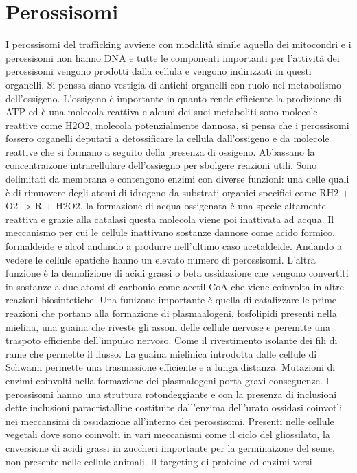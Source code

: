 \section{Perossisomi}
I perossisomi del trafficking avviene con modalit\`a simile aquella dei mitocondri e i perossisomi non hanno DNA e tutte le componenti importanti per l'attivit\`a dei perossisomi
vengono prodotti dalla cellula e vengono indirizzati in questi organelli. Si penssa siano vestigia di antichi organelli con ruolo nel metabolismo dell'ossigeno. L'ossigeno \`e importante
in quanto rende efficiente la prodizione di ATP ed \`e una molecola reattiva e alcuni dei suoi metaboliti sono molecole reattive come H2O2, molecola potenzialmente dannosa, si pensa 
che i perossisomi fossero organelli deputati a detossificare la cellula dall'ossigeno e da molecole reattive che si formano a seguito della presenza di ossigeno. Abbassano 
la concentraizone intracellulare dell'ossiegno per sbolgere reazioni utili. Sono delimitati da membrana e contengono enzimi con diverse funzioni: una delle quali \`e di rimuovere degli
atomi di idrogeno da substrati organici specifici come RH2 + O2 -> R + H2O2, la formazione di acqua ossigenata \`e una specie altamente reattiva e grazie alla catalasi questa molecola
viene poi inattivata ad acqua. Il meccanismo per cui le cellule inattivano sostanze dannose come acido formico, formaldeide e alcol andando a produrre nell'ultimo caso acetaldeide. 
Andando a vedere le cellule epatiche hanno un elevato numero di perossisomi. L'altra funzione \`e la demolizione di acidi grassi o beta ossidazione che vengono convertiti in sostanze a 
due atomi di carbonio come acetil CoA che viene coinvolta in altre reazioni biosintetiche. Una funizone importante \`e quella di catalizzare le prime reazioni che portano alla formazione
di plasmaalogeni, fosfolipidi presenti nella mielina, una guaina che riveste gli assoni delle cellule nervose e peremtte una traspoto efficiente dell'impulso nervoso. Come il rivestimento
isolante dei fili di rame che permette il flusso. La guaina mielinica introdotta dalle cellule di Schwann permette una trasmissione efficiente e a lunga distanza. Mutazioni di enzimi
coinvolti nella formazione dei plasmalogeni porta gravi conseguenze. I perossisomi hanno una struttura rotondeggiante e con la presenza di inclusioni dette inclusioni paracristalline 
costituite dall'enzima dell'urato ossidasi coinvotli nei meccansimi di ossidazione all'interno dei perossisomi. Presenti nelle cellule vegetali dove sono coinvolti in vari meccanismi come
il ciclo del gliossilato, la cnversione di acidi grassi in zuccheri importante per la germinaizone del seme, non presente nelle cellule animali. Il targeting di proteine ed enzimi versi
